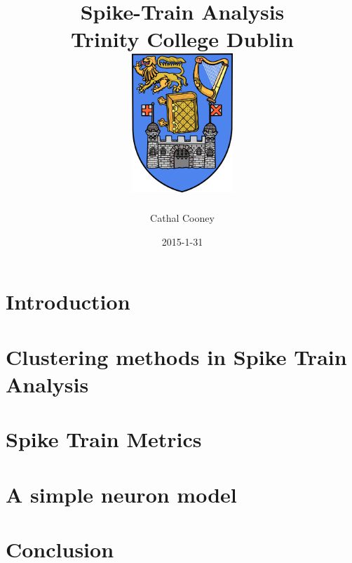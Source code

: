 \documentclass[12pt]{report}
\title{
	{Spike-Train Analysis} \\
	{\large Trinity College Dublin} \bigskip\\
	{\includegraphics[width=1.5in]{tcd.png}}
}
\author{Cathal Cooney}
\date{2015-1-31}
\begin{document}
\maketitle

%
%
%

\tableofcontents


\chapter{Introduction}


\chapter{Clustering methods in Spike Train Analysis}


\chapter{Spike Train Metrics}


\chapter{A simple neuron model}


\chapter{Conclusion}



\end{document}

